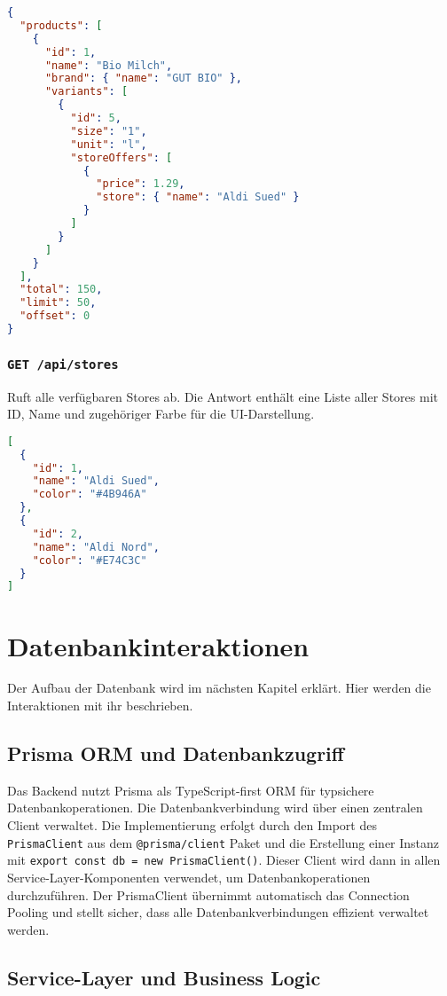 \begin{lstlisting}[language=JSON]
{
  "products": [
    {
      "id": 1,
      "name": "Bio Milch",
      "brand": { "name": "GUT BIO" },
      "variants": [
        {
          "id": 5,
          "size": "1",
          "unit": "l",
          "storeOffers": [
            {
              "price": 1.29,
              "store": { "name": "Aldi Sued" }
            }
          ]
        }
      ]
    }
  ],
  "total": 150,
  "limit": 50,
  "offset": 0
}
\end{lstlisting}

\subsubsection{\texttt{GET /api/stores}}

Ruft alle verfügbaren Stores ab. Die Antwort enthält eine Liste aller Stores mit ID, Name und zugehöriger Farbe für die UI-Darstellung.

\begin{lstlisting}[language=JSON]
[
  {
    "id": 1,
    "name": "Aldi Sued",
    "color": "#4B946A"
  },
  {
    "id": 2,
    "name": "Aldi Nord", 
    "color": "#E74C3C"
  }
]
\end{lstlisting}

\section{Datenbankinteraktionen}

Der Aufbau der Datenbank wird im nächsten Kapitel erklärt. Hier werden die Interaktionen mit ihr beschrieben.

\subsection{Prisma ORM und Datenbankzugriff}

Das Backend nutzt Prisma als TypeScript-first ORM für typsichere Datenbankoperationen. Die Datenbankverbindung wird über einen zentralen Client verwaltet. Die Implementierung erfolgt durch den Import des \texttt{PrismaClient} aus dem \texttt{@prisma/client} Paket und die Erstellung einer Instanz mit \texttt{export const db = new PrismaClient()}. Dieser Client wird dann in allen Service-Layer-Komponenten verwendet, um Datenbankoperationen durchzuführen. Der PrismaClient übernimmt automatisch das Connection Pooling und stellt sicher, dass alle Datenbankverbindungen effizient verwaltet werden.

\subsection{Service-Layer und Business Logic}

